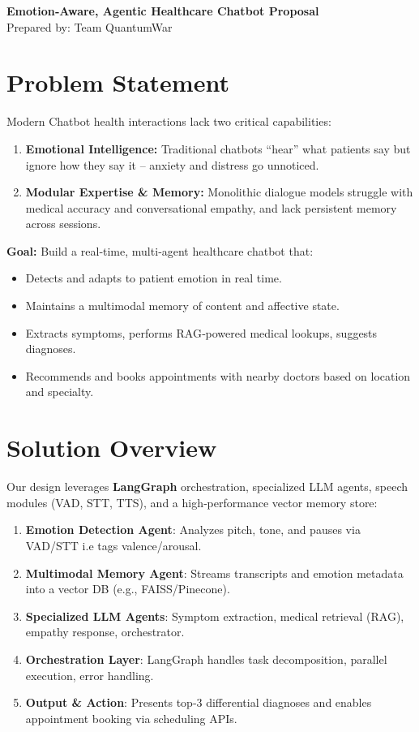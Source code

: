 \documentclass[11pt,a4paper]{article}
\begin{document}
\begin{center}
  {\LARGE \bfseries Emotion‐Aware, Agentic Healthcare Chatbot Proposal} \\
  \vspace{0.5em}
  {Prepared by: Team QuantumWar}
\end{center}

\vspace{1em}

\section{Problem Statement}
Modern Chatbot health interactions lack two critical capabilities:
\begin{enumerate}[left=0pt,label=\arabic*)]
  \item \textbf{Emotional Intelligence:} Traditional chatbots “hear” what patients say but ignore how they say it – anxiety and distress go unnoticed.
  \item \textbf{Modular Expertise \& Memory:} Monolithic dialogue models struggle with medical accuracy and conversational empathy, and lack persistent memory across sessions.
\end{enumerate}

\textbf{Goal:} Build a real‐time, multi‐agent healthcare chatbot that:
\begin{itemize}[left=0pt]
  \item Detects and adapts to patient emotion in real time.
  \item Maintains a multimodal memory of content and affective state.
  \item Extracts symptoms, performs RAG‐powered medical lookups, suggests diagnoses.
  \item Recommends and books appointments with nearby doctors based on location and specialty.
\end{itemize}

\section{Solution Overview}
Our design leverages \textbf{LangGraph} orchestration, specialized LLM agents, speech modules (VAD, STT, TTS), and a high‐performance vector memory store:
\begin{enumerate}[left=0pt]
  \item \textbf{Emotion Detection Agent}: Analyzes pitch, tone, and pauses via VAD/STT i.e tags valence/arousal.
  \item \textbf{Multimodal Memory Agent}: Streams transcripts and emotion metadata into a vector DB (e.g., FAISS/Pinecone).
  \item \textbf{Specialized LLM Agents}: Symptom extraction, medical retrieval (RAG), empathy response, orchestrator.
  \item \textbf{Orchestration Layer}: LangGraph handles task decomposition, parallel execution, error handling.
  \item \textbf{Output \& Action}: Presents top‐3 differential diagnoses and enables appointment booking via scheduling APIs.
\end{enumerate}
\end{document}
